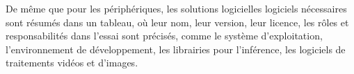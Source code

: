 ﻿\noindent De même que pour les périphériques, les solutions logicielles logiciels nécessaires sont résumés dans un tableau, où leur nom, leur version, leur licence, les rôles et responsabilités dans l'essai sont précisés, comme le système d'exploitation, l'environnement de développement, les librairies pour l'inférence, les logiciels de traitements vidéos et d'images.
